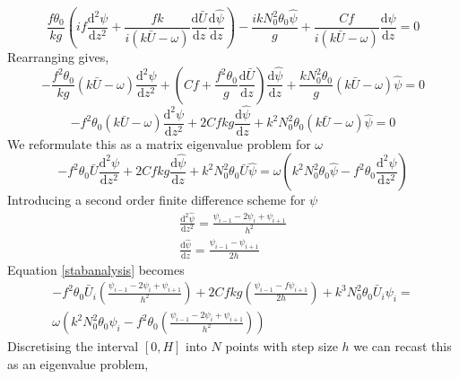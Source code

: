 \begin{equation*}
\frac{f\theta_0}{kg}\left(if\frac{\text{d}^2{\psi}}{\text{d}z^2} + \frac{fk}{i(k\bar{U}-\omega)}\frac{\text{d}\bar{U}}{\text{d}z}\frac{\text{d}\hat{\psi}}{\text{d}z}\right) - \frac{ik N_0^2\theta_0\hat{\psi}}{g} + \frac{Cf}{i(k\bar{U}-\omega)}\frac{\text{d}\psi}{\text{d}z} =0
\end{equation*}
Rearranging gives,
\begin{equation*}
-\frac{f^2\theta_0}{kg}(k\bar{U}-\omega)\frac{\text{d}^2{\psi}}{\text{d}z^2}+\left(Cf+\frac{f^2\theta_0}{g}\frac{\text{d}\bar{U}}{\text{d}z}\right)\frac{\text{d}\hat{\psi}}{\text{d}z}+\frac{k N_0^2\theta_0}{g}(k\bar{U}-\omega)\hat{\psi}=0
\end{equation*}
\begin{equation*}
-f^2\theta_0(k\bar{U}-\omega)\frac{\text{d}^2{\psi}}{\text{d}z^2}+2Cfkg\frac{\text{d}\hat{\psi}}{\text{d}z}+k^2 N_0^2\theta_0(k\bar{U}-\omega)\hat{\psi}=0
\end{equation*}
We reformulate this as a matrix eigenvalue problem for $\omega$
\begin{equation}
-f^2\theta_0\bar{U}\frac{\text{d}^2{\psi}}{\text{d}z^2}+2Cfkg\frac{\text{d}\hat{\psi}}{\text{d}z}+k^2 N_0^2\theta_0\bar{U}\hat{\psi}=\omega \left(k^2N_0^2\theta_0\hat{\psi}-f^2\theta_0 \frac{\text{d}^2{\psi}}{\text{d}z^2}\right)
\label{stabanalysis}
\end{equation}
Introducing a second order finite difference scheme for $\psi$
\begin{equation*}
\begin{aligned}
\frac{\text{d}^2{\hat{\psi}}}{\text{d}z^2} = \frac{\psi_{i-1} - 2\psi_i + \psi_{i+1}}{h^2}\\
\frac{\text{d}\hat{\psi}}{\text{d}z} = \frac{\psi_{i-1} - \psi_{i+1}}{2h}
\end{aligned}
\end{equation*}
Equation \ref{stabanalysis} becomes
\begin{equation}
\begin{aligned}
-f^2\theta_0\bar{U}_i\left(\frac{\psi_{i-1} - 2\psi_i + \psi_{i+1}}{h^2}\right)+2Cfkg\left(\frac{\psi_{i-1} -f \psi_{i+1}}{2h}\right)+k^3 N_0^2\theta_0\bar{U}_i\psi_i= \\
\omega\left(k^2N_0^2\theta_0\psi_i-f^2\theta_0\left(\frac{\psi_{i-1} - 2\psi_i + \psi_{i+1}}{h^2}\right)\right)
\end{aligned}
\end{equation}
Discretising the interval $[0,H]$ into $N$ points with step size $h$ we can recast this as an eigenvalue problem,
